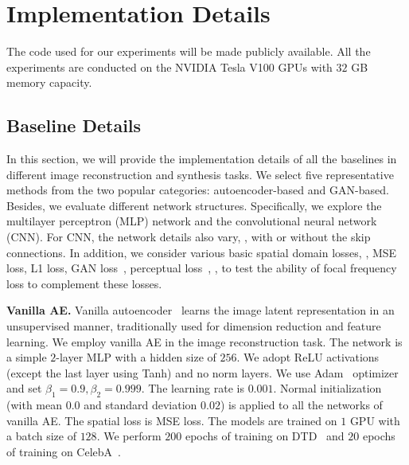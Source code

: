 \documentclass[10pt,twocolumn,letterpaper]{article}
\begin{document}
\section{Implementation Details}
\label{sec:implementation}
The code used for our experiments will be made publicly available.
All the experiments are conducted on the NVIDIA Tesla V100 GPUs with $32$ GB memory capacity.

\subsection{Baseline Details}
\label{sec:baselinedetails}
In this section, we will provide the implementation details of all the baselines in different image reconstruction and synthesis tasks.
We select five representative methods from the two popular categories: autoencoder-based and GAN-based.
Besides, we evaluate different network structures. Specifically, we explore the multilayer perceptron (MLP) network and the convolutional neural network (CNN). For CNN, the network details also vary, \eg, with or without the skip connections.
In addition, we consider various basic spatial domain losses, \eg, MSE loss, L1 loss, GAN loss~\cite{GAN}, perceptual loss~\cite{perceptualloss}, \etc, to test the ability of focal frequency loss to complement these losses.





\vspace{0.05cm}
\noindent
\textbf{Vanilla AE.}
Vanilla autoencoder~\cite{ae} learns the image latent representation in an unsupervised manner, traditionally used for dimension reduction and feature learning.
We employ vanilla AE in the image reconstruction task.
The network is a simple $2$-layer MLP with a hidden size of $256$. We adopt ReLU activations (except the last layer using Tanh) and no norm layers.
We use Adam~\cite{adam} optimizer and set $\beta_1=0.9, \beta_2=0.999$. The learning rate is $0.001$. Normal initialization (with mean $0.0$ and standard deviation $0.02$) is applied to all the networks of vanilla AE.
The spatial loss is MSE loss.
The models are trained on $1$ GPU with a batch size of $128$.
We perform $200$ epochs of training on DTD~\cite{DTD} and $20$ epochs of training on CelebA~\cite{celeba}.
\end{document}
